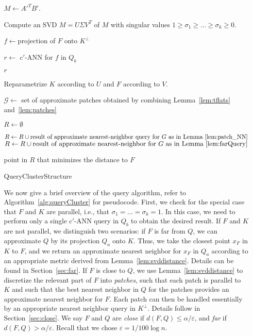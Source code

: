 \documentclass[a4paper,11pt]{paper}
\newcommand{\mathset}[1]{\ensuremath {\mathbb {#1}}}
\newcommand{\eps}{\varepsilon}
\newcommand{\R}{\mathset{R}}
\newenvironment{alg}{\begin{algorithm}[htbp]}{\end{algorithm}}
\begin{document}
\begin{alg}
\Input{query $k$-flat $F \subseteq \R^d$;
  an estimate $\widetilde{r}$ with
  $d(F, Q) \in [\widetilde{r}/n^t, \widetilde{r}]$.}

  $M \gets A'^TB'$.

  Compute an SVD $M = U \Sigma V^T$ of $M$ with singular values
    $1 \geq \sigma_1 \geq \dots \geq \sigma_k \geq 0$.

   {

    $f \gets $projection of $F$ onto $K^\perp$

    $r \gets$  $c'$-ANN for $f$ in $Q_b$

     \Return $r$
  }

  Reparametrize $K$ according to $U$ and $F$ according to $V$.


  $\mathcal{G} \gets $ set of approximate patches obtained
    by combining Lemma~\ref{lem:tflats} and~\ref{lem:patches}

  $R \gets \emptyset$

   {
    $R \gets R \cup \text{result of approximate nearest-neighbor
      query for $G$ as in Lemma~\ref{lem:patch_NN}}$
  }
    $R \gets R \cup \text{result of approximate nearest-neighbor
    for $G$ as in Lemma~\ref{lem:farQuery}}$

  \Return point in $R$ that minimizes the distance to $F$
 \caption{QueryClusterStructure}
 \label{alg:queryCluster}
\end{alg}

We now give a brief overview of the query algorithm,
refer to Algorithm~\ref{alg:queryCluster} for pseudocode.
First,  we check for the special case that $F$ and $K$ are
parallel, i.e., that $\sigma_1 = \dots = \sigma_k = 1$. In
this case, we need to perform only a single $c'$-ANN
query in $Q_b$ to obtain the desired result.
If $F$ and $K$ are not parallel, we distinguish two
scenarios: if $F$ is far from $Q$, we can approximate $Q$ by
its projection $Q_a$ onto $K$. Thus, we take the closest point
$x_F$ in $K$ to $F$, and we return an approximate nearest neighbor for
$x_F$ in $Q_a$ according to an appropriate metric derived
from Lemma~\ref{lem:svddistance}. Details can be found in
Section~\ref{sec:far}.
If $F$ is close to $Q$, we use Lemma~\ref{lem:svddistance} to
discretize the relevant
part of $F$ into \emph{patches}, such that each patch is
parallel to $K$ and such that the best nearest
neighbor in $Q$ for the patches provides an approximate nearest
neighbor for $F$. Each patch can then
be handled essentially by an appropriate nearest neighbor
query in $K^\perp$. Details follow in Section~\ref{sec:close}.
 We say $F$ and $Q$ are \emph{close}
if $d(F, Q) \leq \alpha/\eps$, and \emph{far} if
$d(F, Q) > \alpha/\eps$. Recall that we chose $\eps = 1/100\log n$.
\end{document}

